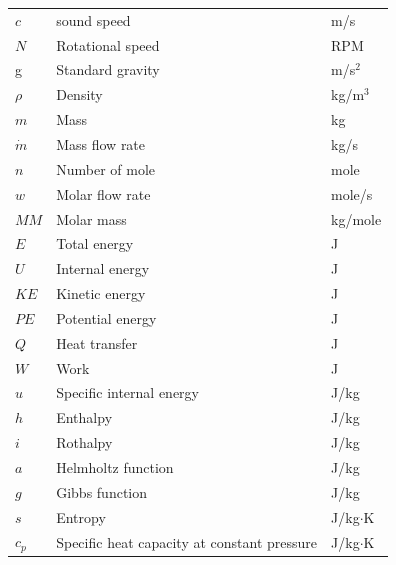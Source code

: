 \documentclass[12pt,a4paper]{report}
\begin{document}
\begin{longtable}[c]{lll}
$c$          & sound speed                                 & m/s            \\
$N$          & Rotational speed                            & RPM            \\
g            & Standard gravity                            & m/s$^2$        \\
$\rho$       & Density                                     & kg/m$^3$       \\
$m$          & Mass                                        & kg             \\
$\dot{m}$    & Mass flow rate                              & kg/s           \\
$n$          & Number of mole                              & mole           \\
$w$          & Molar flow rate                             & mole/s         \\
$MM$         & Molar mass                                  & kg/mole        \\
$E$          & Total energy                                & J              \\
$U$          & Internal energy                             & J              \\
$KE$         & Kinetic energy                              & J              \\
$PE$         & Potential energy                            & J              \\
$Q$          & Heat transfer                               & J              \\
$W$          & Work                                        & J              \\
$u$          & Specific internal energy                    & J/kg           \\
$h$          & Enthalpy                                    & J/kg           \\
$i$          & Rothalpy                                    & J/kg           \\
$a$          & Helmholtz function                          & J/kg           \\
$g$          & Gibbs function                              & J/kg           \\
$s$          & Entropy                                     & J/kg$\cdot$K   \\
$c_p$        & Specific heat capacity at constant pressure & J/kg$\cdot$K   \\

\end{longtable}
\end{document}
